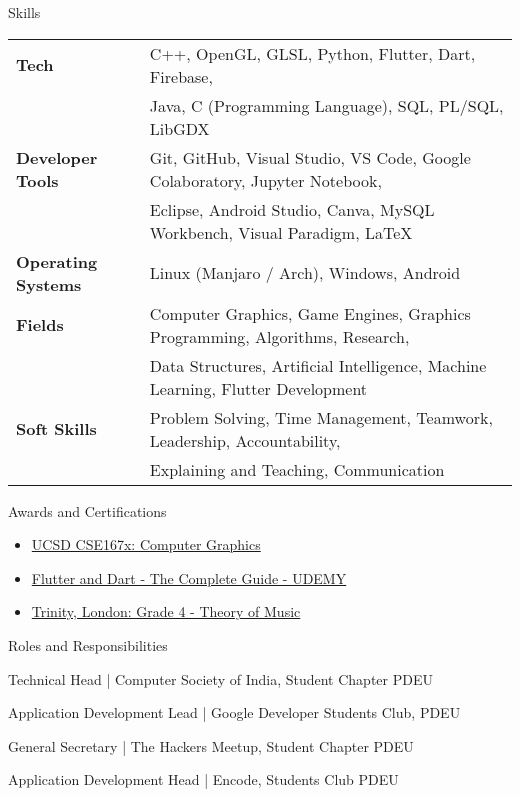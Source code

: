 \documentclass{resume}
\begin{document}
\begin{rSection}{Skills}
\begin{tabular}{ @{} >{\bfseries}l @{\hspace{5ex}} l }
Tech 
& C++, OpenGL, GLSL, Python, Flutter, Dart, Firebase, \\ 
& Java, C (Programming Language), SQL, PL/SQL, LibGDX
\\
Developer Tools 
& Git, GitHub, Visual Studio, VS Code, Google Colaboratory, Jupyter Notebook, \\
& Eclipse, Android Studio, Canva, MySQL Workbench, Visual Paradigm, LaTeX
\\
Operating Systems 
& Linux (Manjaro / Arch), Windows, Android
\\
Fields 
& Computer Graphics, Game Engines, Graphics Programming, Algorithms, Research, \\
& Data Structures, Artificial Intelligence, Machine Learning, Flutter Development
\\
Soft Skills 
& Problem Solving, Time Management, Teamwork, Leadership, Accountability, \\
& Explaining and Teaching, Communication
\end{tabular}
\end{rSection}

\begin{rSection}{Awards and Certifications} 
\begin{itemize}
    \item \href{https://courses.edx.org/certificates/3e47add62a6b45269149bf91b91f1399}{UCSD CSE167x: Computer Graphics}
    \item \href{https://www.udemy.com/certificate/UC-2fce7723-1cc7-403d-a54b-09dbd5cd495e/}{Flutter and Dart - The Complete Guide - UDEMY}
    \item \href{https://drive.google.com/file/d/1S-b58wIceYXIlX24bubJy8Z2aT2lQV2d/view?usp=sharing}{Trinity, London: Grade 4 - Theory of Music}
\end{itemize}
\end{rSection}

\begin{rSection}{Roles and Responsibilities}
\vspace{-1em}
\item {Technical Head} | {Computer Society of India, Student Chapter PDEU}
\item {Application Development Lead} | {Google Developer Students Club, PDEU}
\item {General Secretary} | {The Hackers Meetup, Student Chapter PDEU}
\item {Application Development Head} | {Encode, Students Club PDEU}
\end{rSection}
\end{document}
